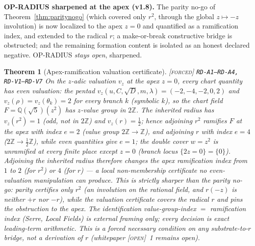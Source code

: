 \documentclass[11pt]{article}
\newcommand{\tagF}{\textcolor{cF}{\textsc{[forced]}}}
\newcommand{\tagO}{\textcolor{cO}{\textsc{[open]}}}
\newcommand{\hx}[1]{\textcolor{cC}{\footnotesize\texttt{#1}}}
\newcommand{\Q}{\mathbb{Q}}
\newcommand{\Z}{\mathbb{Z}}
\theoremstyle{plain}
\newtheorem{theorem}{Theorem}[section]
\theoremstyle{definition}
\theoremstyle{remark}
\begin{document}
\smallskip\noindent
\textbf{OP-RADIUS sharpened at the apex (v1.8).} The parity no-go of
Theorem~\ref{thm:paritynogo} (which covered only $r^2$, through the global
$z\mapsto-z$ involution) is now localized to the apex $z=0$ and quantified as a
ramification index, and extended to the radical $r$; a make-or-break
constructive bridge is obstructed; and the remaining formation content is
isolated as an honest declared negative. OP-RADIUS \emph{stays open}, sharpened.

\begin{theorem}[Apex-ramification valuation certificate]\label{thm:apexram}\tagF{} \hx{RD-A1--RD-A4, RD-V1--RD-V7}
On the $z$-adic valuation $v_z$ at the apex $z=0$, every chart quantity has
\emph{even} valuation: the pentad $v_z(u,C,\sqrt D,m,\lambda)=(-2,-4,-2,0,2)$
and $v_z(\rho)=v_z(\theta_k)=2$ for \emph{every} branch $k$ (symbolic $k$), so
the chart field $F=\Q(\sqrt5)(z^2)$ has $z$-value group in $2\Z$. The inherited
radius has $v_z(r^2)=1$ (odd, not in $2\Z$) and $v_z(r)=\tfrac12$; hence
adjoining $r^2$ ramifies $F$ at the apex with index $e=2$ (value group
$2\Z\to\Z$), and adjoining $r$ with index $e=4$ ($2\Z\to\tfrac12\Z$), while
even quantities give $e=1$; the double cover $w=z^2$ is unramified at every
finite place except $z=0$ (branch locus $\{2z=0\}=\{0\}$). Adjoining the
inherited radius therefore changes the apex ramification index from $1$ to
$2$ (for $r^2$) or $4$ (for $r$) --- a local non-membership certificate no
even-valuation manipulation can produce. This is strictly sharper than the
parity no-go: parity certifies only $r^2$ (an involution on the rational
field, and $r(-z)$ is neither $+r$ nor $-r$), while the valuation certificate
covers the radical $r$ and pins the obstruction to the apex. The
identification value-group-index $=$ ramification index (Serre, \emph{Local
Fields}) is external framing only; every decision is exact leading-term
arithmetic. This is a forced \emph{necessary condition} on any substrate-to-$r$
bridge, not a derivation of $r$ (whitepaper \tagO{}~1 remains open).
\end{theorem}
\end{document}
